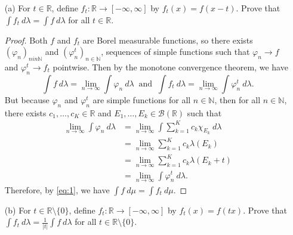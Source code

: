 \documentclass[12pt]{article}
\newcommand{\R}{\mathbb{R}}
\newcommand{\N}{\mathbb{N}}
\newcommand{\al}[1]{\begin{align*}#1\end{align*}}
\newcommand{\qeq}[1]{\begin{equation}#1\end{equation}}
\begin{document}
\begin{itemize}
    \item[(a)] For $t \in \R$, define $f_t : \R \to [-\infty, \infty]$ by $f_t(x) = f(x - t)$. Prove that $\int f_t ~d \lambda = \int f ~d \lambda$ for all $t \in \R$.
    \begin{proof}
        Both $f$ and $f_t$ are Borel measurable functions, so there exists $(\varphi_n)_{n in \N}$ and $(\varphi_n^t)_{n \in \N}$, sequences of simple functions such that $\varphi_n \to f$ and $\varphi_n^t \to f_t$ pointwise. Then by the monotone convergence theorem, we have \qeq{\int f ~d \lambda = \lim_{n \to \infty} \int \varphi_n ~d \lambda ~ \text{ and } ~ \int f_t ~d \lambda = \lim_{n \to \infty} \int \varphi_n^t ~d \lambda. \label{eq:1}} But because $\varphi_n$ and $\varphi_n^t$ are simple functions for all $n \in \N$, then for all $n \in \N$, there exists $c_1, \ldots, c_K \in \R$ and $E_1, \ldots, E_k \in \mathcal{B}(\R)$ such that 
        \al{\lim_{n \to \infty} \int \varphi_n ~d \lambda 
                &= \lim_{n \to \infty} \int \sum_{k=1}^K c_k \chi_{E_k} ~d \lambda \\
                &= \lim_{n \to \infty} \sum_{k=1}^{K} c_k \lambda(E_k) \\
                &= \lim_{n \to \infty} \sum_{k=1}^{K} c_k \lambda(E_k + t) \\
                &= \lim_{n \to \infty} \int \varphi_n^t ~d \lambda.}
        Therefore, by \eqref{eq:1}, we have $\int f ~d \mu = \int f_t ~d \mu$.
    \end{proof}
    \item[(b)] For $t \in \R \setminus \{0\}$, define $f_t : \R \to [-\infty, \infty]$ by $f_t(x) = f(tx)$. Prove that $\int f_t ~d \lambda = \frac{1}{|t|}\int f ~d \lambda$ for all $t \in \R \setminus \{0\}$.
    

\end{itemize}
\end{document}
